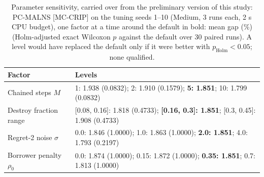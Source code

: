 \begin{table}[pos=H]
\centering
\caption{Parameter sensitivity, carried over from the preliminary version of this study: PC-MALNS [MC-CRIP] on the tuning seeds 1--10 (Medium, 3 runs each, 2 s CPU budget), one factor at a time around the default in bold: mean gap (\%) (Holm-adjusted exact Wilcoxon $p$ against the default over 30 paired runs). A level would have replaced the default only if it were better with $p_{\text{Holm}} < 0.05$; none qualified.}
\label{tab:tuning}
\footnotesize
\begin{tabular}{@{}lp{}@{}}
\toprule
Factor & Levels \\
\midrule
Chained steps $M$ & 1: 1.938 (0.0832); 2: 1.910 (0.1579); \textbf{5: 1.851}; 10: 1.799 (0.0832) \\
Destroy fraction range & [0.08, 0.16]: 1.818 (0.4733); \textbf{[0.16, 0.3]: 1.851}; [0.3, 0.45]: 1.908 (0.4733) \\
Regret-2 noise $\sigma$ & 0.0: 1.846 (1.0000); 1.0: 1.863 (1.0000); \textbf{2.0: 1.851}; 4.0: 1.793 (0.2197) \\
Borrower penalty $\rho_0$ & 0.0: 1.874 (1.0000); 0.15: 1.872 (1.0000); \textbf{0.35: 1.851}; 0.7: 1.813 (1.0000) \\
\bottomrule
\end{tabular}
\end{table}
